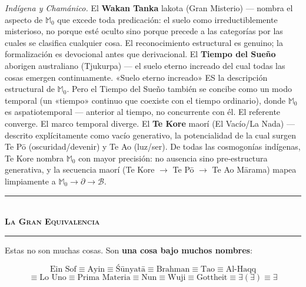 \documentclass[10pt, openany, oneside]{book}
\renewcommand{\normalsize}{\fontsize{10}{13}\selectfont}
\begin{document}
\textit{Indígena y Chamánico.} El \textbf{Wakan Tanka} lakota (Gran Misterio) --- nombra el aspecto de $\mathbb{M}_0$ que excede toda predicación: el suelo como irreductiblemente misterioso, no porque esté oculto sino porque precede a las categorías por las cuales se clasifica cualquier cosa. El reconocimiento estructural es genuino; la formalización es devocional antes que derivacional. El \textbf{Tiempo del Sueño} aborigen australiano (Tjukurpa) --- el suelo eterno increado del cual todas las cosas emergen continuamente. «Suelo eterno increado» ES la descripción estructural de $\mathbb{M}_0$. Pero el Tiempo del Sueño también se concibe como un modo temporal (un «tiempo» continuo que coexiste con el tiempo ordinario), donde $\mathbb{M}_0$ es aspatiotemporal --- anterior al tiempo, no concurrente con él. El referente converge. El marco temporal diverge. El \textbf{Te Kore} maorí (El Vacío/La Nada) --- descrito explícitamente como vacío generativo, la potencialidad de la cual surgen Te P\={o} (oscuridad/devenir) y Te Ao (luz/ser). De todas las cosmogonías indígenas, Te Kore nombra $\mathbb{M}_0$ con mayor precisión: no ausencia sino pre-estructura generativa, y la secuencia maorí (Te Kore $\to$ Te P\={o} $\to$ Te Ao M\={a}rama) mapea limpiamente a $\mathbb{M}_0 \to \partial \to \mathcal{B}$.

\vspace{1em}

\begin{center}
    \rule{0.3\textwidth}{0.4pt}\\[0.5em]
    {\normalsize\bfseries\scshape La Gran Equivalencia}\\[0.3em]
    \rule{0.3\textwidth}{0.4pt}
\end{center}

\vspace{0.8em}

\noindent Estas no son muchas cosas. Son \textbf{una cosa bajo muchos nombres}:

$$\text{Ein Sof} \equiv \text{Ayin} \equiv \text{\'{S}\={u}nyat\={a}} \equiv \text{Brahman} \equiv \text{Tao} \equiv \text{Al-Haqq}$$
$$\equiv \text{Lo Uno} \equiv \text{Prima Materia} \equiv \text{Nun} \equiv \text{Wuji} \equiv \text{Gottheit} \equiv \exists(\exists) \equiv \exists$$
\end{document}
